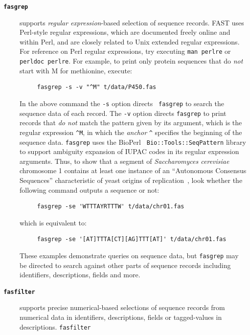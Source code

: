 \documentclass{frontiersSCNS} %
\begin{document}
\begin{description}
\item[\texttt{ \textbf{fasgrep}} ] supports {\it regular
    expression}-based selection of sequence records. FAST uses
  Perl-style regular expressions, which are documented freely online
  and within Perl, and are closely related to Unix extended regular
  expressions. For reference on Perl regular expressions, try
  executing {\tt man perlre} or {\tt perldoc perlre}.  For example, to
  print only protein sequences that do {\it not} start with M for
  methionine, execute:
\begin{verbatim}
     fasgrep -s -v "^M" t/data/P450.fas
\end{verbatim}
  \noindent In the above command the {\tt -s} option directs {\tt
    fasgrep} to search the sequence data of each record. The {\tt -v}
  option directs {\tt fasgrep} to print records that {\it do not}
  match the pattern given by its argument, which is the regular
  expression \verb|^M|, in which the {\it anchor} \verb|^| specifies
  the beginning of the sequence data. {\tt fasgrep} uses the BioPerl {\tt
    Bio::Tools::SeqPattern} library to support ambiguity expansion of
  IUPAC codes in its regular expression arguments. Thus, to show that
  a segment of {\it Saccharomyces cerevisiae} chromosome 1 contains at
  least one instance of an ``Autonomous Consensus Sequences''
  characteristic of yeast origins of
  replication~\citep{leonard_dna_2013}, look whether the following
  command outputs a sequence or not:
\begin{verbatim}
     fasgrep -se 'WTTTAYRTTTW' t/data/chr01.fas
\end{verbatim}
\noindent which is equivalent to: 
\begin{verbatim}
     fasgrep -se '[AT]TTTA[CT][AG]TTT[AT]' t/data/chr01.fas
\end{verbatim}
\noindent These examples demonstrate queries on sequence data, but
{\tt fasgrep} may be directed to search against other parts of
sequence records including identifiers, descriptions, fields and
more.
\\
\item[\texttt{ \textbf{fasfilter}} ] supports precise numerical-based
selections of sequence records from numerical data in identifiers,
descriptions, fields or tagged-values in descriptions. {\tt fasfilter}

\end{description}
\end{document}
